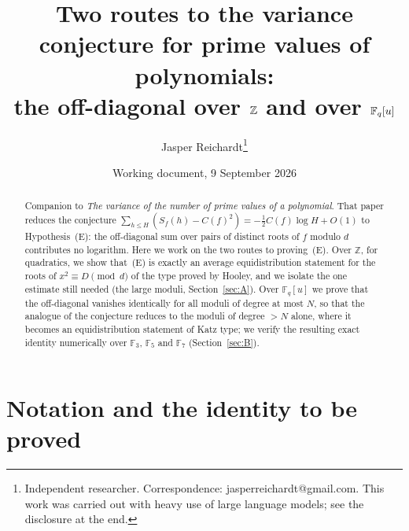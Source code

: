 \documentclass[11pt,a4paper]{article}
\title{Two routes to the variance conjecture for prime values of polynomials:\\
the off-diagonal over $\Z$ and over $\F_q[u]$}
\author{Jasper Reichardt\thanks{Independent researcher. Correspondence: jasperreichardt@gmail.com. This work was
carried out with heavy use of large language models; see the disclosure at the end.}}
\date{Working document, 9 September 2026}
\newcommand{\Z}{\mathbb{Z}}
\newcommand{\F}{\mathbb{F}}
\begin{document}
\maketitle

\begin{center}\end{center}
\medskip

\begin{abstract}
Companion to \emph{The variance of the number of prime values of a polynomial}. That paper reduces the
conjecture $\sum_{h\le H}(S_f(h)-C(f)^2)=-\tfrac12C(f)\log H+O(1)$ to Hypothesis~(E): the off-diagonal
sum over pairs of distinct roots of $f$ modulo $d$ contributes no logarithm. Here we work on the two
routes to proving~(E). Over $\Z$, for quadratics, we show that~(E) is exactly an average
equidistribution statement for the roots of $x^2\equiv D\pmod d$ of the type proved by Hooley, and we
isolate the one estimate still needed (the large moduli, Section~\ref{sec:A}). Over $\F_q[u]$ we prove
that the off-diagonal vanishes identically for all moduli of degree at most $N$, so that the analogue
of the conjecture reduces to the moduli of degree $>N$ alone, where it becomes an equidistribution
statement of Katz type; we verify the resulting exact identity numerically over $\F_3$, $\F_5$ and
$\F_7$ (Section~\ref{sec:B}).
\end{abstract}

\section{Notation and the identity to be proved}
\end{document}
